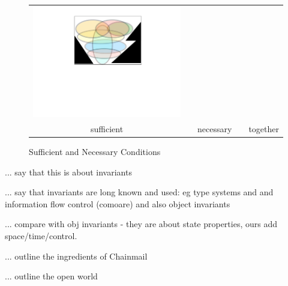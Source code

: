 \begin{figure}[htb]
\begin{tabular}{ccccc}
\begin{minipage}{0.25\textwidth}
 \includegraphics[width=\linewidth, trim=250  320 260 60,clip]{diagrams/NecAndSuff.pdf}
\end{minipage}
\\
sufficient & & necessary & & together
 \end{tabular}
  \vspace*{-4.5mm}
  \caption{Sufficient and Necessary Conditions}
 \label{fig:NecessaryAndSuff}
 \end{figure}

... say that this is about invariants

... say that invariants are long known and used: eg type systems and and information flow control (comoare) and also
object invariants

... compare with obj invariants - they are about state properties, ours add space/time/control.

... outline the ingredients of Chainmail

... outline the open world



